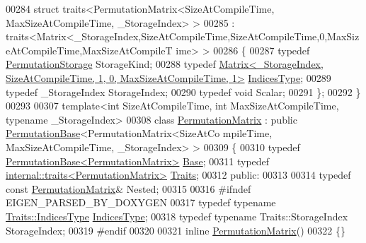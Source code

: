 \begin{DoxyCode}
00284 \textcolor{keyword}{struct }traits<PermutationMatrix<SizeAtCompileTime, MaxSizeAtCompileTime, \_StorageIndex> >
00285  : traits<Matrix<\_StorageIndex,SizeAtCompileTime,SizeAtCompileTime,0,MaxSizeAtCompileTime,MaxSizeAtCompileT
      ime> >
00286 \{
00287   \textcolor{keyword}{typedef} \hyperlink{struct_eigen_1_1_permutation_storage}{PermutationStorage} StorageKind;
00288   \textcolor{keyword}{typedef} 
      \hyperlink{group___core___module_class_eigen_1_1_matrix}{Matrix<\_StorageIndex, SizeAtCompileTime, 1, 0, MaxSizeAtCompileTime, 1>}
       \hyperlink{group___core___module_class_eigen_1_1_matrix}{IndicesType};
00289   \textcolor{keyword}{typedef} \_StorageIndex StorageIndex;
00290   \textcolor{keyword}{typedef} \textcolor{keywordtype}{void} Scalar;
00291 \};
00292 \}
00293 
00307 \textcolor{keyword}{template}<\textcolor{keywordtype}{int} SizeAtCompileTime, \textcolor{keywordtype}{int} MaxSizeAtCompileTime, \textcolor{keyword}{typename} \_StorageIndex>
00308 \textcolor{keyword}{class }\hyperlink{group___core___module_class_eigen_1_1_permutation_matrix}{PermutationMatrix} : \textcolor{keyword}{public} \hyperlink{group___core___module_class_eigen_1_1_permutation_base}{PermutationBase}<PermutationMatrix<SizeAtCo
      mpileTime, MaxSizeAtCompileTime, \_StorageIndex> >
00309 \{
00310     \textcolor{keyword}{typedef} \hyperlink{group___core___module_class_eigen_1_1_permutation_base}{PermutationBase<PermutationMatrix>} 
      \hyperlink{group___core___module_struct_eigen_1_1_eigen_base}{Base};
00311     \textcolor{keyword}{typedef} \hyperlink{struct_eigen_1_1internal_1_1traits}{internal::traits<PermutationMatrix>} 
      \hyperlink{struct_eigen_1_1internal_1_1traits_3_01_permutation_matrix_3_01_size_at_compile_time_00_01_max_sd0808d93099012556270f7c7cd36fcc5}{Traits};
00312   \textcolor{keyword}{public}:
00313 
00314     \textcolor{keyword}{typedef} \textcolor{keyword}{const} \hyperlink{group___core___module_class_eigen_1_1_permutation_matrix}{PermutationMatrix}& Nested;
00315 
00316 \textcolor{preprocessor}{    #ifndef EIGEN\_PARSED\_BY\_DOXYGEN}
00317     \textcolor{keyword}{typedef} \textcolor{keyword}{typename} \hyperlink{group___core___module_class_eigen_1_1_matrix}{Traits::IndicesType} \hyperlink{group___core___module_class_eigen_1_1_matrix}{IndicesType};
00318     \textcolor{keyword}{typedef} \textcolor{keyword}{typename} Traits::StorageIndex StorageIndex;
00319 \textcolor{preprocessor}{    #endif}
00320 
00321     \textcolor{keyword}{inline} \hyperlink{group___core___module_class_eigen_1_1_permutation_matrix}{PermutationMatrix}()
00322     \{\}

\end{DoxyCode}
